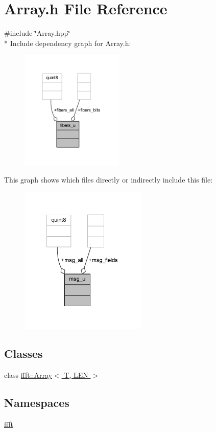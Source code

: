 \hypertarget{a00083}{\section{Array.\+h File Reference}
\label{a00083}
}
{\ttfamily \#include \char`\"{}Array.\+hpp\char`\"{}}\\*
Include dependency graph for Array.\+h\+:
\nopagebreak
\begin{figure}[H]
\begin{center}
\leavevmode
\includegraphics[width=139pt]{d4/d08/a00237}
\end{center}
\end{figure}
This graph shows which files directly or indirectly include this file\+:
\nopagebreak
\begin{figure}[H]
\begin{center}
\leavevmode
\includegraphics[width=171pt]{da/d2e/a00238}
\end{center}
\end{figure}
\subsection*{Classes}
\begin{DoxyCompactItemize}
\item 
class \hyperlink{a00003}{ffft\+::\+Array$<$ T, L\+E\+N $>$}
\end{DoxyCompactItemize}
\subsection*{Namespaces}
\begin{DoxyCompactItemize}
\item 
 \hyperlink{a00142}{ffft}
\end{DoxyCompactItemize}
